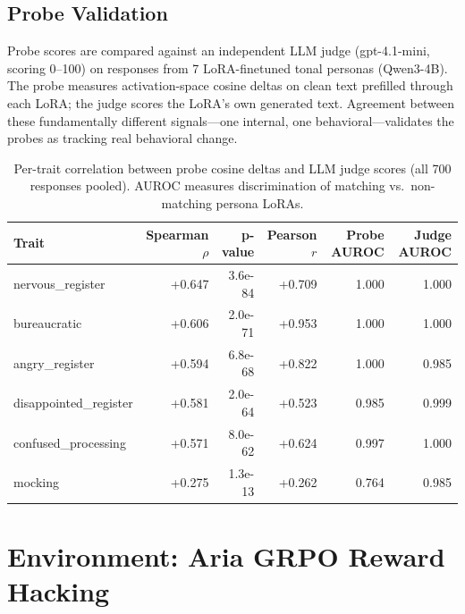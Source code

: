 \documentclass[11pt]{article}
\begin{document}
\subsection{Probe Validation}

Probe scores are compared against an independent LLM judge (gpt-4.1-mini, scoring 0--100) on responses from 7 LoRA-finetuned tonal personas (Qwen3-4B). The probe measures activation-space cosine deltas on clean text prefilled through each LoRA; the judge scores the LoRA's own generated text. Agreement between these fundamentally different signals---one internal, one behavioral---validates the probes as tracking real behavioral change.

\begin{table}[h]
\centering
\begin{tabular}{lrrrrr}
\toprule
Trait & Spearman $\rho$ & p-value & Pearson $r$ & Probe AUROC & Judge AUROC \\
\midrule
nervous\_register      & +0.647 & 3.6e-84 & +0.709 & 1.000 & 1.000 \\
bureaucratic           & +0.606 & 2.0e-71 & +0.953 & 1.000 & 1.000 \\
angry\_register        & +0.594 & 6.8e-68 & +0.822 & 1.000 & 0.985 \\
disappointed\_register & +0.581 & 2.0e-64 & +0.523 & 0.985 & 0.999 \\
confused\_processing   & +0.571 & 8.0e-62 & +0.624 & 0.997 & 1.000 \\
mocking                & +0.275 & 1.3e-13 & +0.262 & 0.764 & 0.985 \\
\bottomrule
\end{tabular}
\caption{Per-trait correlation between probe cosine deltas and LLM judge scores (all 700 responses pooled). AUROC measures discrimination of matching vs.\ non-matching persona LoRAs.}
\label{tab:probe-validation}
\end{table}


\section{Environment: Aria GRPO Reward Hacking}

\end{document}
